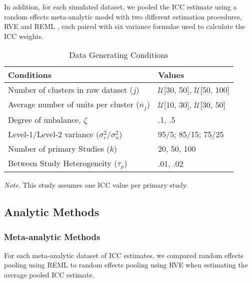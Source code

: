 In addition, for each simulated dataset, we pooled the ICC estimate using a random effects meta-analytic model \cite{higgins2009re} with two different estimation procedures, RVE \cite{hedges2010} and REML \cite{viechtbauer2015}, each paired with six variance formulae used to calculate the ICC weights. 

\begin{table}[h!]
\caption{Data Generating Conditions}
\begin{tabular}{ll}
\toprule
Conditions                                & Values                                                                               \\ 
\midrule
Number of clusters in raw dataset ($j$)                  & $\mathcal{U}$[30, 50], $\mathcal{U}$[50, 100]                                                                         \\
Average number of units per cluster ($\overline{n}_j$)       & $\mathcal{U}$[10, 30], $\mathcal{U}$[30, 50]                  \\
Degree of unbalance, $\zeta$ & .1, .5
 \\
 
Level-1/Level-2 variance ($\sigma^2_e/\sigma^2_u$)            &  95/5; 85/15; 75/25                                                          \\

Number of primary Studies ($k$)            &  20, 50, 100                                                                      \\

Between Study Heterogeneity ($\tau_{\rho}$) & .01, .02
\\
\bottomrule
\end{tabular}


\bigskip
\small\textit{Note}. This study assumes one ICC value per primary study.

\label{table:datagen}
\end{table}



\subsection{Analytic Methods}

\subsubsection{Meta-analytic Methods}

For each meta-analytic dataset of ICC estimates, we compared random effects pooling using REML \cite{viechtbauer2015} to random effects pooling using RVE \cite{hedges2010} when estimating the average pooled ICC estimate.

